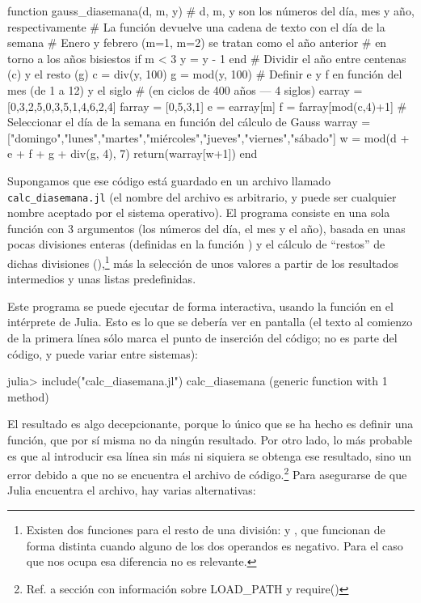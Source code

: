 ﻿\documentclass[spanish]{article}
\begin{document}
function gauss_diasemana(d, m, y)
# d, m, y son los números del día, mes y año, respectivamente
# La función devuelve una cadena de texto con el día de la semana
  # Enero y febrero (m=1, m=2) se tratan como el año anterior
  # en torno a los años bisiestos
  if m < 3
    y = y - 1
  end
  # Dividir el año entre centenas (c) y el resto (g)
  c = div(y, 100)
  g = mod(y, 100)
  # Definir e y f en función del mes (de 1 a 12) y el siglo
  # (en ciclos de 400 años --- 4 siglos)
  earray = [0,3,2,5,0,3,5,1,4,6,2,4]
  farray = [0,5,3,1]
  e = earray[m]
  f = farray[mod(c,4)+1]
  # Seleccionar el día de la semana en función del cálculo de Gauss
  warray = ["domingo","lunes","martes","miércoles","jueves","viernes","sábado"]
  w = mod(d + e + f + g + div(g, 4), 7)
  return(warray[w+1])
end

Supongamos que ese código está guardado en un archivo llamado
\texttt{calc_diasemana.jl} (el nombre del archivo es arbitrario, y puede ser
cualquier nombre aceptado por el sistema operativo).
El programa consiste en una sola función con 3 argumentos (los números del
día, el mes y el año), basada en unas pocas divisiones enteras
(definidas en la función ) y el cálculo de ``restos'' de
dichas divisiones (),\footnote{%
Existen dos funciones para el resto de una división:  y ,
que funcionan de forma distinta cuando alguno de los dos operandos es negativo.
Para el caso que nos ocupa esa diferencia no es relevante.}%
más la selección de unos valores a partir de los resultados intermedios y
unas listas predefinidas.

Este programa se puede ejecutar de forma interactiva, usando la función
 en el intérprete de Julia. Esto es lo que se debería ver
en pantalla (el texto  al comienzo de la primera línea
sólo marca el punto de inserción del código; no es parte
del código, y puede variar entre sistemas):

julia> include("calc_diasemana.jl")
calc_diasemana (generic function with 1 method)

El resultado es algo decepcionante, porque lo único que se ha hecho es
definir una función, que por sí misma no da ningún resultado. Por otro
lado, lo más probable es que al introducir esa línea sin más ni siquiera
se obtenga ese resultado, sino un error debido a que no se encuentra
el archivo de código.\footnote{%
Ref. a sección con información sobre LOAD\_PATH y require()%
}%
Para asegurarse de que Julia encuentra el archivo,
hay varias alternativas:
\end{document}
